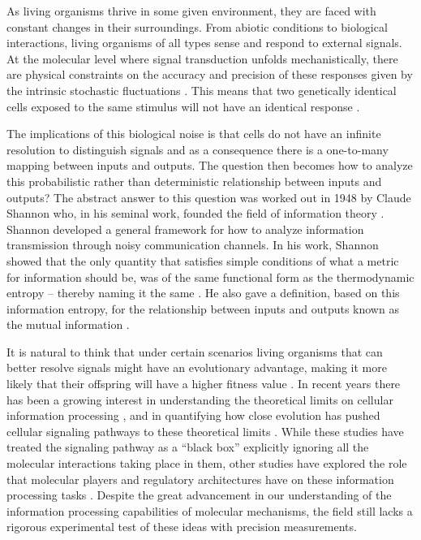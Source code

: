 As living organisms thrive in some given environment, they are faced with
constant changes in their surroundings. From abiotic conditions to biological
interactions, living organisms of all types sense and respond to external
signals. At the molecular level where signal transduction unfolds
mechanistically, there are physical constraints on the accuracy and precision of
these responses given by the intrinsic stochastic fluctuations
\cite{Nemenman2010}. This means that two genetically identical cells exposed to
the same stimulus will not have an identical response \cite{Eldar2010}.

The implications of this biological noise is that cells do not have an infinite
resolution to distinguish signals and as a consequence there is a one-to-many
mapping between inputs and outputs. The question then becomes how to analyze
this probabilistic rather than deterministic relationship between inputs and
outputs? The abstract answer to this question was worked out in 1948 by Claude
Shannon who, in his seminal work, founded the field of information theory
\cite{Shannon1948}. Shannon developed a general framework for how to analyze
information transmission through noisy communication channels. In his work,
Shannon showed that the only quantity that satisfies simple conditions of what a
metric for information should be, was of the same functional form as the
thermodynamic entropy -- thereby naming it the same \cite{MacKay2003}. He also
gave a definition, based on this information entropy, for the relationship
between inputs and outputs known as the mutual information .

It is natural to think that under certain scenarios living organisms that can
better resolve signals might have an evolutionary advantage, making it more
likely that their offspring will have a higher fitness value \cite{Taylor2007a}.
In recent years there has been a growing interest in understanding the
theoretical limits on cellular information processing \cite{Bialek2005,
Gregor2007}, and in quantifying how close evolution has pushed cellular
signaling pathways to these theoretical limits \cite{Tkacik2008, Dubuis2013,
Petkova2016}. While these studies have treated the signaling pathway as a
``black box'' explicitly ignoring all the molecular interactions taking place in
them, other studies have explored the role that molecular players and regulatory
architectures have on these information processing tasks \cite{Rieckh2014,
Ziv2007, Voliotis2014, Tostevin2009, Tkacik2011, Tkacik2008a, Tabbaa2014}.
Despite the great advancement in our understanding of the information
processing capabilities of molecular mechanisms, the field still lacks a
rigorous experimental test of these ideas with precision measurements.

